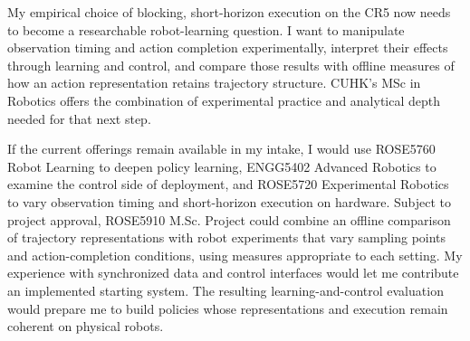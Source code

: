 My empirical choice of blocking, short-horizon execution on the CR5 now needs to become a researchable robot-learning question. I want to manipulate observation timing and action completion experimentally, interpret their effects through learning and control, and compare those results with offline measures of how an action representation retains trajectory structure. CUHK's MSc in Robotics offers the combination of experimental practice and analytical depth needed for that next step.

If the current offerings remain available in my intake, I would use ROSE5760 Robot Learning to deepen policy learning, ENGG5402 Advanced Robotics to examine the control side of deployment, and ROSE5720 Experimental Robotics to vary observation timing and short-horizon execution on hardware. Subject to project approval, ROSE5910 M.Sc. Project could combine an offline comparison of trajectory representations with robot experiments that vary sampling points and action-completion conditions, using measures appropriate to each setting. My experience with synchronized data and control interfaces would let me contribute an implemented starting system. The resulting learning-and-control evaluation would prepare me to build policies whose representations and execution remain coherent on physical robots.
